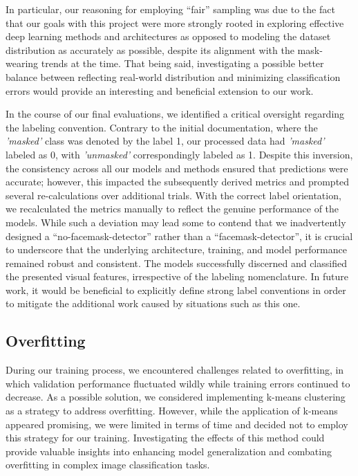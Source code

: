 \documentclass{article}
\begin{document}
In particular, our reasoning for employing \enquote{fair} sampling was due to the fact that our goals with this project were more strongly rooted in exploring effective deep learning methods and architectures as opposed to modeling the dataset distribution as accurately as possible, despite its alignment with the mask-wearing trends at the time. That being said, investigating a possible better balance between reflecting real-world distribution and minimizing classification errors would provide an interesting and beneficial extension to our work.

In the course of our final evaluations, we identified a critical oversight regarding the labeling convention. Contrary to the initial documentation, where the \textit{'masked'} class was denoted by the label 1, our processed data had \textit{'masked'} labeled as 0, with \textit{'unmasked'} correspondingly labeled as 1. Despite this inversion, the consistency across all our models and methods ensured that predictions were accurate; however, this impacted the subsequently derived metrics and prompted several re-calculations over additional trials. With the correct label orientation, we recalculated the metrics manually to reflect the genuine performance of the models. While such a deviation may lead some to contend that we inadvertently designed a \enquote{no-facemask-detector} rather than a \enquote{facemask-detector}, it is crucial to underscore that the underlying architecture, training, and model performance remained robust and consistent. The models successfully discerned and classified the presented visual features, irrespective of the labeling nomenclature. In future work, it would be beneficial to explicitly define strong label conventions in order to mitigate the additional work caused by situations such as this one.

\subsection{Overfitting}

During our training process, we encountered challenges related to overfitting, in which validation performance fluctuated wildly while training errors continued to decrease. As a possible solution, we considered implementing k-means clustering as a strategy to address overfitting. However, while the application of k-means appeared promising, we were limited in terms of time and decided not to employ this strategy for our training. Investigating the effects of this method could provide valuable insights into enhancing model generalization and combating overfitting in complex image classification tasks.
\end{document}
